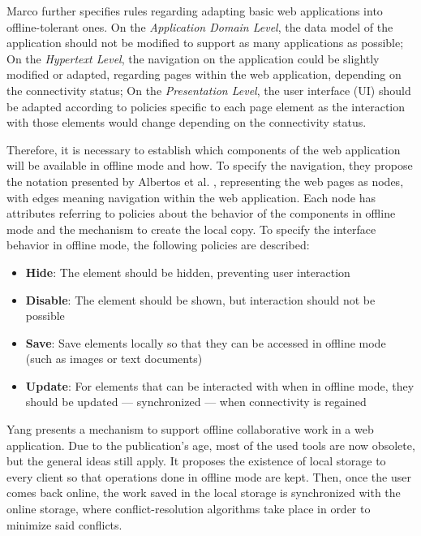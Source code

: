 Marco \cite{Marco2015} further specifies rules regarding adapting basic web applications into offline-tolerant ones. On the \textit{Application Domain Level}, the data model of the application should not be modified to support as many applications as possible; On the \textit{Hypertext Level}, the navigation on the application could be slightly modified or adapted, regarding pages within the web application, depending on the connectivity status; On the \textit{Presentation Level}, the user interface (UI) should be adapted according to policies specific to each page element as the interaction with those elements would change depending on the connectivity status.

Therefore, it is necessary to establish which components of the web application will be available in offline mode and how.
To specify the navigation, they propose the notation presented by Albertos et al. \cite{Penichet2013}, representing the web pages as nodes, with edges meaning navigation within the web application. Each node has attributes referring to policies about the behavior of the components in offline mode and the mechanism to create the local copy. To specify the interface behavior in offline mode, the following policies are described:

\begin{itemize}
    \item \textbf{Hide}: The element should be hidden, preventing user interaction
    \item \textbf{Disable}: The element should be shown, but interaction should not be possible
    \item \textbf{Save}: Save elements locally so that they can be accessed in offline mode (such as images or text documents)
    \item \textbf{Update}: For elements that can be interacted with when in offline mode, they should be updated --- synchronized --- when connectivity is regained
\end{itemize}

Yang \cite{Yang2000} presents a mechanism to support offline collaborative work in a web application. Due to the publication's age, most of the used tools are now obsolete, but the general ideas still apply. It proposes the existence of local storage to every client so that operations done in offline mode are kept. Then, once the user comes back online, the work saved in the local storage is synchronized with the online storage, where conflict-resolution algorithms take place in order to minimize said conflicts.

